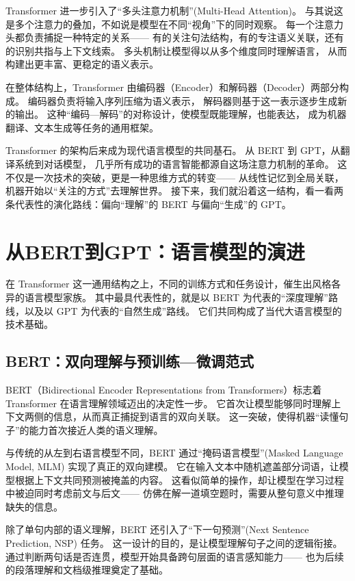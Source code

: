 Transformer 进一步引入了“多头注意力机制”(Multi-Head Attention)。  
与其说这是多个注意力的叠加，不如说是模型在不同“视角”下的同时观察。  
每一个注意力头都负责捕捉一种特定的关系——  
有的关注句法结构，有的专注语义关联，还有的识别共指与上下文线索。  
多头机制让模型得以从多个维度同时理解语言，  
从而构建出更丰富、更稳定的语义表示。  

在整体结构上，Transformer 由编码器（Encoder）和解码器（Decoder）两部分构成。  
编码器负责将输入序列压缩为语义表示，  
解码器则基于这一表示逐步生成新的输出。  
这种“编码—解码”的对称设计，使模型既能理解，也能表达，  
成为机器翻译、文本生成等任务的通用框架。  

Transformer 的架构后来成为现代语言模型的共同基石。  
从 BERT 到 GPT，从翻译系统到对话模型，  
几乎所有成功的语言智能都源自这场注意力机制的革命。  
这不仅是一次技术的突破，更是一种思维方式的转变——  
从线性记忆到全局关联，机器开始以“关注的方式”去理解世界。  
接下来，我们就沿着这一结构，看一看两条代表性的演化路线：偏向“理解”的 BERT 与偏向“生成”的 GPT。

\section{从BERT到GPT：语言模型的演进}
在 Transformer 这一通用结构之上，不同的训练方式和任务设计，催生出风格各异的语言模型家族。
其中最具代表性的，就是以 BERT 为代表的“深度理解”路线，以及以 GPT 为代表的“自然生成”路线。
它们共同构成了当代大语言模型的技术基础。

\subsection{BERT：双向理解与预训练—微调范式}

BERT（Bidirectional Encoder Representations from Transformers）标志着 Transformer 在语言理解领域迈出的决定性一步。  
它首次让模型能够同时理解上下文两侧的信息，从而真正捕捉到语言的双向关联。  
这一突破，使得机器“读懂句子”的能力首次接近人类的语义理解。  

与传统的从左到右语言模型不同，BERT 通过“掩码语言模型”(Masked Language Model, MLM) 实现了真正的双向建模。  
它在输入文本中随机遮盖部分词语，让模型根据上下文共同预测被掩盖的内容。  
这看似简单的操作，却让模型在学习过程中被迫同时考虑前文与后文——  
仿佛在解一道填空题时，需要从整句意义中推理缺失的信息。  

除了单句内部的语义理解，BERT 还引入了“下一句预测”(Next Sentence Prediction, NSP) 任务。  
这一设计的目的，是让模型理解句子之间的逻辑衔接。  
通过判断两句话是否连贯，模型开始具备跨句层面的语言感知能力——  
也为后续的段落理解和文档级推理奠定了基础。  

